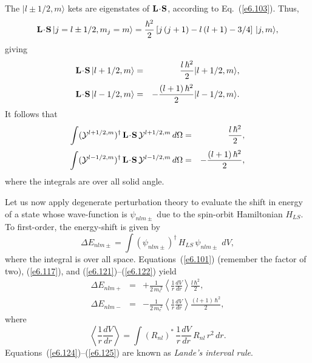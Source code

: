 The $|l\pm 1/2, m\rangle$ kets are eigenstates of ${\bf L}\!\cdot\!{\bf S}$,
according to Eq.~(\ref{e6.103}).
Thus,
\begin{equation}
{\bf L} \!\cdot\!{\bf S}\, |j=l\pm 1/2,m_j= m\rangle = \frac{\hbar^2}{2}
\left[ j\,(j+1) - l\,(l+1) - 3/4\right]\,|j,m\rangle,
\end{equation}
giving
\begin{eqnarray}
{\bf L} \!\cdot\!{\bf S}\, |l+ 1/2, m\rangle&=&
\frac{l \,\hbar^2}{2} |l+ 1/2, m\rangle,\\[0.5ex]
{\bf L} \!\cdot\!{\bf S}\, |l- 1/2, m\rangle&=&
-\frac{(l+1)\, \hbar^2}{2} |l- 1/2, m\rangle.
\end{eqnarray}
It follows that
\begin{eqnarray}\label{e6.121}
\int ({\cal Y}^{l+1/2, m})^\dagger \,{\bf L} \!\cdot\!{\bf S}\,
{\cal Y}^{l+1/2, m}\, d\Omega& =& \frac{l \,\hbar^2}{2},\\[0.5ex]
\int ({\cal Y}^{l-1/2, m})^\dagger \,{\bf L} \!\cdot\!{\bf S}\,
{\cal Y}^{l-1/2, m}\, d\Omega& =& -\frac{(l+1) \,\hbar^2}{2},\label{e6.122}
\end{eqnarray}
where the integrals are over all solid angle. 

Let us now apply degenerate perturbation theory to evaluate the
 shift in energy  of a  state whose wave-function is $\psi_{nlm\pm}$ 
due to the spin-orbit Hamiltonian $H_{LS}$. To first-order, the energy-shift is given by
\begin{equation}
\Delta E_{nlm\pm} = \int (\psi_{nlm\pm})^\dagger\, H_{LS}\,\psi_{nlm\pm}\,
\,dV,
\end{equation}
where the integral is over all space. Equations~(\ref{e6.101}) (remember the
factor of two), (\ref{e6.117}), and (\ref{e6.121})--(\ref{e6.122}) yield
\begin{eqnarray}\label{e6.124}
\Delta E_{nlm+} &=& +\frac{1}{2\,m_e^{~2}} \left\langle \frac{1}{r}\frac{dV}{dr}
\right\rangle \frac{l\,\hbar^2}{2},\\[0.5ex]
\Delta E_{nlm-} &=&- \frac{1}{2\,m_e^{~2}} \left\langle \frac{1}{r}\frac{dV}{dr}
\right\rangle \frac{(l+1)\,\hbar^2}{2},\label{e6.125}
\end{eqnarray}
where
\begin{equation}\label{e6.126}
 \left\langle \frac{1}{r}\frac{dV}{dr}
\right\rangle = \int (R_{nl})^\ast \,\frac{1}{r}\frac{dV}{dr}\, R_{nl}\,r^2\,dr.
\end{equation}
Equations~(\ref{e6.124})--(\ref{e6.125})  are known as {\em Lande's interval rule}.

